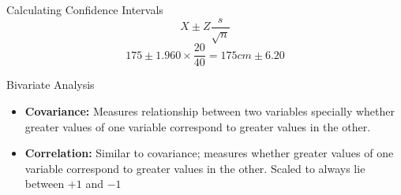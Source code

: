 \begin{frame}[t]{Calculating Confidence Intervals}
	$$
	X \pm Z\frac{s}{\sqrt{n}}
	$$
	$$
	175\pm 1.960 \times \frac{20}{40} = 175cm\pm 6.20
	$$
\end{frame}

\begin{frame}[t]{Bivariate Analysis}
	\begin{itemize}
		\item \textbf{Covariance:} Measures relationship between 
		two variables specially whether greater values of one variable 
		correspond to greater values in the other.
		\item \textbf{Correlation:} Similar to covariance; measures whether 
		greater values of one  variable correspond to greater values in the 
		other. Scaled to always lie between $+1$ and $-1$
	\end{itemize}
\end{frame}


